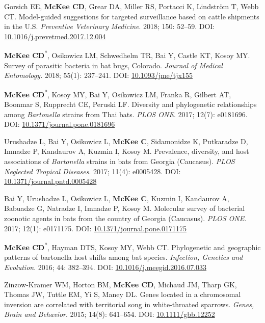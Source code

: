 \documentclass{cv}
\begin{document}
\begin{pubenum}
\item Gorsich EE, \textbf{McKee CD}, Grear DA, Miller RS, Portacci K, Lindström T, Webb CT. Model-guided suggestions for targeted surveillance based on cattle shipments in the U.S. \textit{Preventive Veterinary Medicine}. 2018; 150: 52--59. DOI: \href{https://doi.org/10.1016/j.prevetmed.2017.12.004}{10.1016/j.prevetmed.2017.12.004}

\item \textbf{McKee CD}\textsuperscript{*}, Osikowicz LM, Schwedhelm TR, Bai Y, Castle KT, Kosoy MY. Survey of parasitic bacteria in bat bugs, Colorado. \textit{Journal of Medical Entomology.} 2018; 55(1): 237--241. DOI: \href{https://doi.org/10.1093/jme/tjx155}{10.1093/jme/tjx155}

\item \textbf{McKee CD}\textsuperscript{*}, Kosoy MY, Bai Y, Osikowicz LM, Franka R, Gilbert AT, Boonmar S, Rupprecht CE, Peruski LF. Diversity and phylogenetic relationships among \textit{Bartonella} strains from Thai bats. \textit{PLOS ONE}. 2017; 12(7): e0181696. DOI: \href{https://doi.org/10.1371/journal.pone.0181696}{10.1371/journal.pone.0181696}

\item Urushadze L, Bai Y, Osikowicz L, \textbf{McKee C}, Sidamonidze K, Putkaradze D, Imnadze P, Kandaurov A, Kuzmin I, Kosoy M. Prevalence, diversity, and host associations of \textit{Bartonella} strains in bats from Georgia (Caucasus). \textit{PLOS Neglected Tropical Diseases}. 2017; 11(4): e0005428. DOI: \href{https://doi.org/10.1371/journal.pntd.0005428}{10.1371/journal.pntd.0005428}

\item Bai Y, Urushadze L, Osikowicz L, \textbf{McKee C}, Kuzmin I, Kandaurov A, Babuadze G, Natradze I, Imnadze P, Kosoy M. Molecular survey of bacterial zoonotic agents in bats from the country of Georgia (Caucasus). \textit{PLOS ONE}. 2017; 12(1): e0171175. DOI: \href{https://doi.org/10.1371/journal.pone.0171175}{10.1371/journal.pone.0171175}

\item \textbf{McKee CD}\textsuperscript{*}, Hayman DTS, Kosoy MY, Webb CT. Phylogenetic and geographic patterns of bartonella host shifts among bat species. \textit{Infection, Genetics and Evolution}. 2016; 44: 382--394. DOI: \href{https://doi.org/10.1016/j.meegid.2016.07.033}{10.1016/j.meegid.2016.07.033}

\item Zinzow-Kramer WM, Horton BM, \textbf{McKee CD}, Michaud JM, Tharp GK, Thomas JW, Tuttle EM, Yi S, Maney DL. Genes located in a chromosomal inversion are correlated with territorial song in white-throated sparrows. \textit{Genes, Brain and Behavior}. 2015; 14(8): 641--654. DOI: \href{https://doi.org/10.1111/gbb.12252}{10.1111/gbb.12252}


\end{pubenum}
\end{document}
